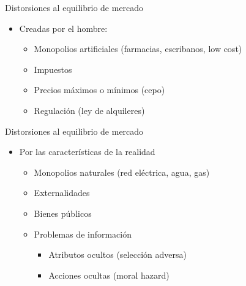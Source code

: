 \documentclass{beamer}
\begin{document}
\begin{frame}{Distorsiones al equilibrio de mercado}
    \begin{itemize}
        \item Creadas por el hombre:
        \begin{itemize}
            \item Monopolios artificiales (farmacias, escribanos, low cost)
             \vspace{1mm}
            \item Impuestos
             \vspace{1mm}
            \item Precios máximos o mínimos (cepo)
             \vspace{1mm}
            \item Regulación (ley de alquileres)
        \end{itemize}
    \end{itemize}
\end{frame}

\begin{frame}{Distorsiones al equilibrio de mercado}
    \begin{itemize}
        \item Por las características de la realidad \vspace{1mm}
        \begin{itemize}
            \item Monopolios naturales (red eléctrica, agua, gas)   
             \vspace{1mm}
            \item Externalidades
             \vspace{1mm}
            \item Bienes públicos
            \vspace{1mm}
            \item Problemas de información
            \begin{itemize}
                \item Atributos ocultos (selección adversa)
                 \vspace{1mm}
                \item Acciones ocultas (moral hazard)
            \end{itemize}        
        \end{itemize}
    \end{itemize}
\end{frame}
\end{document}
